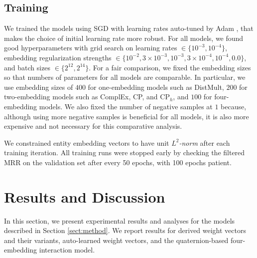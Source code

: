 \documentclass[sigconf,edbt]{acmart-edbt2019}
\begin{document}
\subsection{Training}
We trained the models using SGD with learning rates auto-tuned by Adam \cite{kingma_adammethodstochastic_2014}, that makes the choice of initial learning rate more robust. For all models, we found good hyperparameters with grid search on learning rates $ \in \{10^{-3}, 10^{-4}\} $, embedding regularization strengths $ \in \{10^{-2}, 3 \times 10^{-3}, 10^{-3}, 3 \times 10^{-4}, 10^{-4}, 0.0\} $, and batch sizes $ \in \{2^{12}, 2^{14}\} $. For a fair comparison, we fixed the embedding sizes so that numbers of parameters for all models are comparable. In particular, we use embedding sizes of $ 400 $ for one-embedding models such as DistMult, $ 200 $ for two-embedding models such as ComplEx, CP, and CP$ _h $, and $ 100 $ for four-embedding models. We also fixed the number of negative samples at $ 1 $ because, although using more negative samples is beneficial for all models, it is also more expensive and not necessary for this comparative analysis.

We constrained entity embedding vectors to have unit \textit{$ L^2 $-norm} after each training iteration. All training runs were stopped early by checking the filtered MRR on the validation set after every 50 epochs, with 100 epochs patient.

\section{Results and Discussion} \label{sect:result}
In this section, we present experimental results and analyses for the models described in Section \ref{sect:method}. We report results for derived weight vectors and their variants, auto-learned weight vectors, and the quaternion-based four-embedding interaction model.
\end{document}
